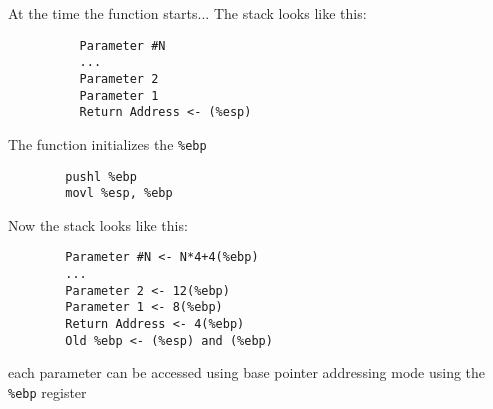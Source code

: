 \begin{frame}[fragile=singleslide]
  \begin{block}{At the time the function starts...}
    The stack looks like this:
    \begin{small}
\begin{verbatim}
          Parameter #N
          ...
          Parameter 2
          Parameter 1
          Return Address <- (%esp)
\end{verbatim}
    \end{small}
  \end{block}
\end{frame}

\begin{frame}[fragile=singleslide]
  \begin{block}{The function initializes the \texttt{\%ebp}}
    \begin{small}
\begin{verbatim}
        pushl %ebp
        movl %esp, %ebp
\end{verbatim}
    \end{small}
    Now the stack looks like this:
    \begin{small}
\begin{verbatim}
        Parameter #N <- N*4+4(%ebp)
        ...
        Parameter 2 <- 12(%ebp)
        Parameter 1 <- 8(%ebp)
        Return Address <- 4(%ebp)
        Old %ebp <- (%esp) and (%ebp)
\end{verbatim}
    \end{small}
\end{block}
  each parameter can be accessed using base pointer addressing mode using the \texttt{\%ebp}
  register
\end{frame}

\begin{frame}[fragile=singleslide]%
\end{frame}

